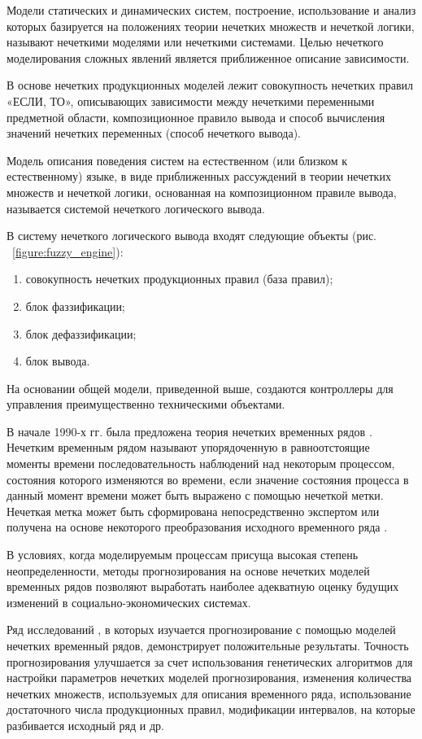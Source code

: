 Модели статических и динамических систем, построение, 
использование и анализ которых базируется на положениях теории нечетких множеств и нечеткой логики, называют нечеткими моделями или нечеткими системами. 
Целью нечеткого моделирования сложных явлений является приближенное описание зависимости. 

В основе нечетких продукционных моделей лежит совокупность нечетких правил «ЕСЛИ, ТО», 
описывающих зависимости между нечеткими переменными предметной области, 
композиционное правило вывода и способ вычисления значений нечетких переменных (способ нечеткого вывода).

Модель описания поведения систем на естественном (или близком к естественному) языке,
в виде приближенных рассуждений в теории нечетких множеств и нечеткой логики,
основанная на композиционном правиле вывода, называется системой нечеткого логического вывода.

В систему нечеткого логического вывода входят следующие объекты (рис. ~\ref{figure:fuzzy_engine}):
\begin{enumerate} 
    \item совокупность нечетких продукционных правил (база правил);
    \item блок фаззификации;
    \item блок дефаззификации;
    \item блок вывода.
\end{enumerate}

На основании общей модели, приведенной выше, создаются контроллеры для управления преимущественно техническими объектами.

В начале 1990-х гг. была предложена теория нечетких временных рядов \cite{Song1993}. 
Нечетким временным рядом называют упорядоченную в равноотстоящие моменты времени последовательность наблюдений над некоторым процессом,
состояния которого изменяются во времени, если значение состояния процесса в данный момент времени может быть выражено с помощью нечеткой метки. 
Нечеткая метка может быть сформирована непосредственно экспертом или получена на основе некоторого преобразования исходного временного ряда \cite{Yarushkina2010}. 

В условиях, когда моделируемым процессам присуща высокая степень неопределенности, 
методы прогнозирования на основе нечетких моделей временных рядов позволяют выработать наиболее адекватную оценку будущих изменений в социально-экономических системах.

Ряд исследований \cite{Chen1996,S.Melike2008,Saxena2012}, в которых изучается прогнозирование с помощью моделей нечетких временный рядов, 
демонстрирует положительные результаты. 
Точность прогнозирования улучшается за счет использования генетических алгоритмов для настройки параметров нечетких моделей прогнозирования, 
изменения количества нечетких множеств, используемых для описания временного ряда, использование достаточного числа продукционных правил, 
модификации интервалов, на которые разбивается исходный ряд и др.

